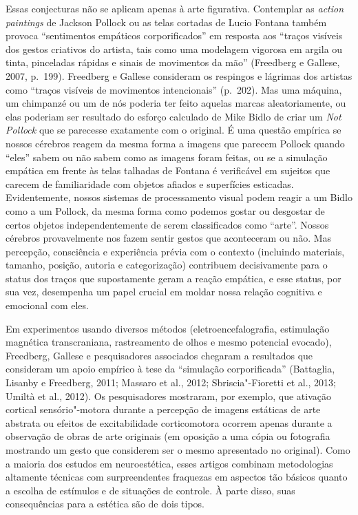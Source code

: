 Essas conjecturas não se aplicam apenas à arte figurativa. Contemplar as
\emph{action paintings} de Jackson Pollock ou as telas cortadas de Lucio
Fontana também provoca ``sentimentos empáticos corporificados'' em
resposta aos ``traços visíveis dos gestos criativos do artista, tais
como uma modelagem vigorosa em argila ou tinta, pinceladas rápidas e
sinais de movimentos da mão'' (Freedberg e Gallese, 2007, p.~199).
Freedberg e Gallese consideram os respingos e lágrimas dos artistas como
``traços visíveis de movimentos intencionais'' (p.~202). Mas uma máquina,
um chimpanzé ou um de nós poderia ter feito aquelas marcas
aleatoriamente, ou elas poderiam ser resultado do esforço calculado de
Mike Bidlo de criar um \emph{Not Pollock} que se parecesse exatamente
com o original. É uma questão empírica se nossos cérebros reagem da
mesma forma a imagens que parecem Pollock quando ``eles'' sabem ou não
sabem como as imagens foram feitas, ou se a simulação empática em frente
às telas talhadas de Fontana é verificável em sujeitos que carecem de
familiaridade com objetos afiados e superfícies esticadas.
Evidentemente, nossos sistemas de processamento visual podem reagir a um
Bidlo como a um Pollock, da mesma forma como podemos gostar ou desgostar
de certos objetos independentemente de serem classificados como
``arte''. Nossos cérebros provavelmente nos fazem sentir gestos que
aconteceram ou não. Mas percepção, consciência e experiência prévia com
o contexto (incluindo materiais, tamanho, posição, autoria e
categorização) contribuem decisivamente para o status dos traços que
supostamente geram a reação empática, e esse status, por sua vez,
desempenha um papel crucial em moldar nossa relação cognitiva e
emocional com eles.

Em experimentos usando diversos métodos (eletroencefalografia,
estimulação magnética transcraniana, rastreamento de olhos e mesmo
potencial evocado), Freedberg, Gallese e pesquisadores associados
chegaram a resultados que consideram um apoio empírico à tese da
``simulação corporificada'' (Battaglia, Lisanby e Freedberg, 2011;
Massaro et al., 2012; Sbriscia"-Fioretti et al., 2013; Umiltà et al.,
2012). Os pesquisadores mostraram, por exemplo, que ativação cortical
sensório"-motora durante a percepção de imagens estáticas de arte
abstrata ou efeitos de excitabilidade corticomotora ocorrem apenas
durante a observação de obras de arte originais (em oposição a uma cópia
ou fotografia mostrando um gesto que considerem ser o mesmo apresentado
no original). Como a maioria dos estudos em neuroestética, esses artigos
combinam metodologias altamente técnicas com surpreendentes fraquezas em
aspectos tão básicos quanto a escolha de estímulos e de situações de
controle. À parte disso, suas consequências para a estética são de dois
tipos.

